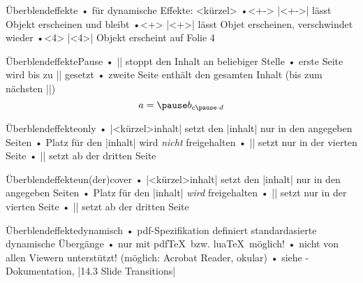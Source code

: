 \begin{frame}[fragile]{Überblendeffekte}
• für dynamische Effekte: <kürzel>
•<+-> |<+->| lässt Objekt erscheinen und bleibt
•<+> |<+>| lässt Objet erscheinen, verschwindet wieder
•<4> |<4>| Objekt erscheint auf Folie 4
\•
\end{frame}


\begin{frame}[fragile]{Überblendeffekte}{Pause}
• {\color{red} |\pause|} stoppt den Inhalt an beliebiger Stelle
• erste Seite wird bis zu |\pause| gesetzt
• zweite Seite enthält den gesamten Inhalt (bis zum nächsten |\pause|)
\•
\[a =\pause b_{c\pause \cdot d}\]
\end{frame}

\begin{frame}[fragile]{Überblendeffekte}{only}
• {\color{red} |\only<kürzel>{inhalt}|} setzt den |inhalt| nur in den angegeben Seiten
• Platz für den |inhalt| wird \emph{nicht} freigehalten
• |\only<4>{inhalt}| setzt nur in der vierten Seite
• || setzt ab der dritten Seite
\•
\end{frame}

\begin{frame}[fragile]{Überblendeffekte}{un(der)cover}
• {\color{red} |\uncover<kürzel>{inhalt}|} setzt den |inhalt| nur in den angegeben Seiten
• Platz für den |inhalt| \emph{wird} freigehalten
• |\uncover<4>{inhalt}| setzt nur in der vierten Seite
• || setzt ab der dritten Seite
\•
\end{frame}

\begin{frame}[fragile]{Überblendeffekte}{dynamisch}
• pdf-Spezifikation definiert standardasierte dynamische Übergänge
• nur mit pdf\TeX\ bzw. lua\TeX\ möglich!
• nicht von allen Viewern unterstützt! (möglich: Acrobat Reader, okular)
• siehe -Dokumentation, |14.3 Slide Transitions|
\•
\end{frame}

